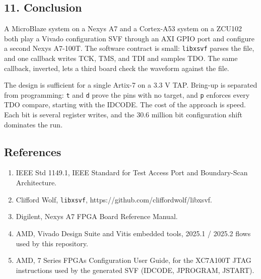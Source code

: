 \documentclass[
  11pt,
  a4paper,
]{article}
\providecommand{\tightlist}{%
  \setlength{\itemsep}{0pt}\setlength{\parskip}{0pt}}
\begin{document}
\subsection{11. Conclusion}\label{conclusion}

A MicroBlaze system on a Nexys A7 and a Cortex-A53 system on a ZCU102
both play a Vivado configuration SVF through an AXI GPIO port and
configure a second Nexys A7-100T. The software contract is small:
\texttt{libxsvf} parses the file, and one callback writes TCK, TMS, and
TDI and samples TDO. The same callback, inverted, lets a third board
check the waveform against the file.

The design is sufficient for a single Artix-7 on a 3.3 V TAP. Bring-up
is separated from programming: \texttt{t} and \texttt{d} prove the pins
with no target, and \texttt{p} enforces every TDO compare, starting with
the IDCODE. The cost of the approach is speed. Each bit is several
register writes, and the 30.6 million bit configuration shift dominates
the run.

\subsection{References}\label{references}

\begin{enumerate}
\def\labelenumi{\arabic{enumi}.}
\tightlist
\item
  IEEE Std 1149.1, IEEE Standard for Test Access Port and Boundary-Scan
  Architecture.
\item
  Clifford Wolf, \texttt{libxsvf},
  https://github.com/cliffordwolf/libxsvf.
\item
  Digilent, Nexys A7 FPGA Board Reference Manual.
\item
  AMD, Vivado Design Suite and Vitis embedded tools, 2025.1 / 2025.2
  flows used by this repository.
\item
  AMD, 7 Series FPGAs Configuration User Guide, for the XC7A100T JTAG
  instructions used by the generated SVF (IDCODE, JPROGRAM, JSTART).
\end{enumerate}
\end{document}
